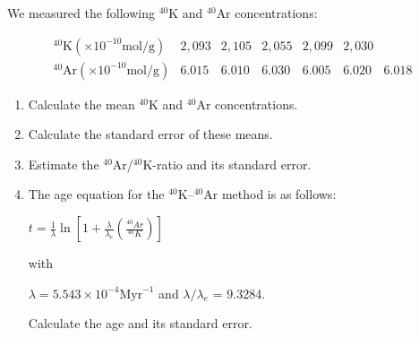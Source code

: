 \documentclass{article}
\begin{document}
\vspace{1cm}

\noindent\begin{minipage}{.5\linewidth}

We measured the following $^{40}$K and $^{40}$Ar concentrations:

\begin{equation*}
  \begin{array}{c|cccccc}
    ^{40}\mbox{K} (\times{10}^{-10} \mbox{mol/g}) & 2,093 & 2,105 & 2,055 & 2,099 & 2,030 & ~ \\
    ^{40}\mbox{Ar} (\times{10}^{-10} \mbox{mol/g}) & 6.015 & 6.010 & 6.030 & 6.005 & 6.020 & 6.018
  \end{array}
\end{equation*}

\begin{enumerate}
\item Calculate the mean $^{40}$K and $^{40}$Ar concentrations.
\item Calculate the standard error of these means.
\item Estimate the $^{40}$Ar/$^{40}$K-ratio and its standard error.
\item The age equation for the $^{40}$K--$^{40}$Ar method is as follows:

  \( t = \frac{1}{\lambda} \ln\left[ 1 + \frac{\lambda}{\lambda_e} \left(\frac{^{40}Ar }{^{40}K}\right) \right] \)

  with

  \(\lambda = 5.543 \times 10^{-4} \mbox{Myr}^{-1}\) and \(\lambda/\lambda_e\) = 9.3284.

  Calculate the age and its standard error.

\end{enumerate}

\end{minipage}
\end{document}
